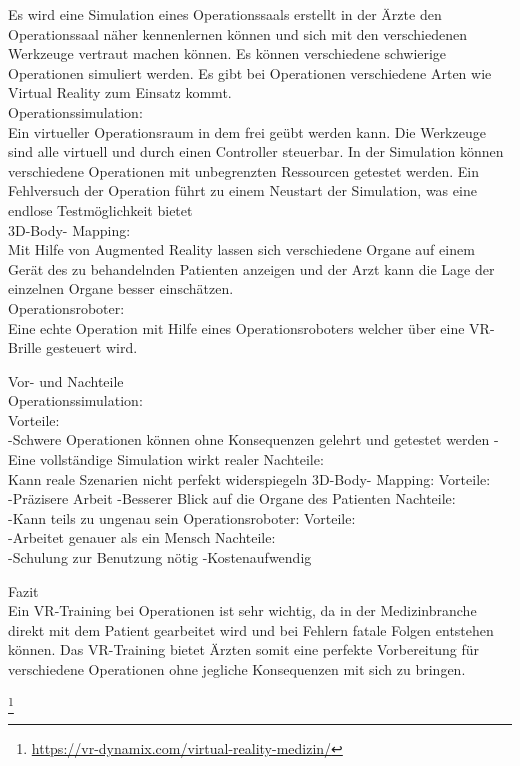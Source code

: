 
Es wird eine Simulation eines Operationssaals erstellt in der Ärzte den Operationssaal näher kennenlernen können und sich mit den verschiedenen Werkzeuge vertraut machen können. Es können verschiedene schwierige Operationen simuliert werden. Es gibt bei Operationen verschiedene Arten wie Virtual Reality zum Einsatz kommt.\\
Operationssimulation:\\
Ein virtueller Operationsraum in dem frei geübt werden kann. Die Werkzeuge sind alle virtuell und durch einen Controller steuerbar. In der Simulation können verschiedene Operationen mit unbegrenzten Ressourcen getestet werden. Ein Fehlversuch der Operation führt zu einem Neustart der Simulation, was eine endlose Testmöglichkeit bietet\\
3D-Body- Mapping:\\
Mit Hilfe von Augmented Reality lassen sich verschiedene Organe auf einem Gerät des zu behandelnden Patienten anzeigen und der Arzt kann die Lage der einzelnen Organe besser einschätzen.\\
Operationsroboter:\\
Eine echte Operation mit Hilfe eines Operationsroboters welcher über eine VR-Brille gesteuert wird.

Vor- und Nachteile\\
Operationssimulation:\\
Vorteile:\\
-Schwere Operationen
können ohne Konsequenzen gelehrt und getestet werden
-Eine vollständige Simulation wirkt realer
Nachteile:\\
Kann reale Szenarien nicht perfekt widerspiegeln
3D-Body- Mapping:
Vorteile:\\
-Präzisere Arbeit
-Besserer Blick auf die Organe des Patienten
Nachteile:\\
-Kann teils zu ungenau sein
Operationsroboter:
Vorteile:\\
-Arbeitet genauer als ein Mensch
Nachteile:\\
-Schulung zur Benutzung nötig
-Kostenaufwendig

Fazit\\
Ein VR-Training bei Operationen ist sehr wichtig, da in der Medizinbranche direkt mit dem Patient gearbeitet wird und bei Fehlern fatale Folgen entstehen können. Das VR-Training bietet Ärzten somit eine perfekte Vorbereitung für verschiedene Operationen ohne jegliche Konsequenzen mit sich zu bringen.


\footnote{\url{https://vr-dynamix.com/virtual-reality-medizin/}}

